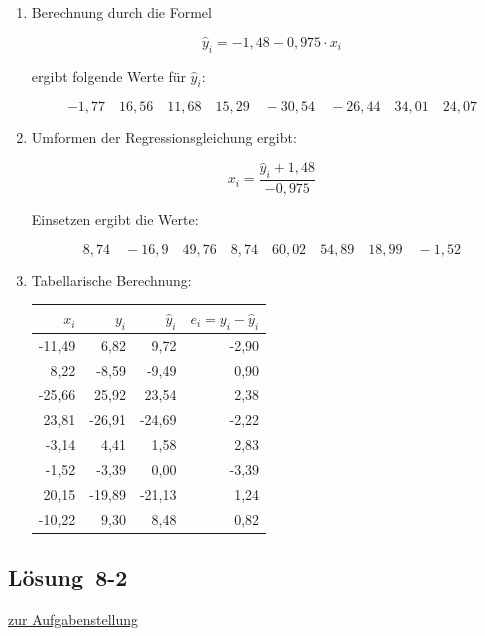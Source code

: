 \documentclass[
  11pt,
  ngerman,
  a4paper,
]{report}
\begin{document}
\begin{enumerate}
\def\labelenumi{\alph{enumi})}
\item
  Berechnung durch die Formel

  \[\hat{y}_i=-1{,}48-0{,}975\cdot x_i\]

  ergibt folgende Werte für \(\hat{y}_i\):

  \[ -1{,}77\quad16{,}56\quad11{,}68\quad15{,}29\quad-30{,}54\quad-26{,}44\quad34{,}01\quad24{,}07 \]
\item
  Umformen der Regressionsgleichung ergibt:

  \[x_i=\frac{\hat{y}_i+1,48}{-0,975}\]

  Einsetzen ergibt die Werte:

  \[8{,}74\quad-16{,}9\quad49{,}76\quad8{,}74\quad60{,}02\quad54{,}89\quad18{,}99\quad-1{,}52\]
\item
  Tabellarische Berechnung:

  \begin{table}[H]
   \centering
   \begin{tabular}{rrrr}
   \toprule
   \textbf{$x_i$} & \textbf{$y_i$} & \textbf{$\hat{y}_i$} & \textbf{$e_i=y_i-\hat{y}_i$}\\
   \midrule
   -11,49 & 6,82 & 9,72 & -2,90\\
   8,22 & -8,59 & -9,49 & 0,90\\
   -25,66 & 25,92 & 23,54 & 2,38\\
   23,81 & -26,91 & -24,69 & -2,22\\
   -3,14 & 4,41 & 1,58 & 2,83\\
   -1,52 & -3,39 & 0,00 & -3,39\\
   20,15 & -19,89 & -21,13 & 1,24\\
   -10,22 & 9,30 & 8,48 & 0,82\\
   \bottomrule
   \end{tabular}
   \end{table}
\end{enumerate}

\hypertarget{loesung-8-2}{%
\subsection{Lösung~8-2}\label{loesung-8-2}}

\protect\hyperlink{aufgabe-8-2}{zur Aufgabenstellung}
\end{document}
